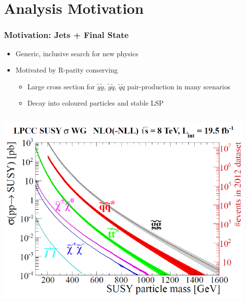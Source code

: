 \documentclass{beamer}
\begin{document}
\section{Analysis Motivation}
\begin{frame}
  \frametitle{Motivation: Jets + \met Final State}
  \begin{itemize}
  \item Generic, inclusive search for new physics
  \item Motivated by R-parity conserving \susy
    \begin{itemize}
    \item Large cross section for $\tilde{g}\tilde{g}$, $\tilde{g}\tilde{q}$, $\tilde{q}\tilde{q}$ pair-production in many scenarios
    \item Decay into coloured \sm particles and stable LSP
    \end{itemize}
  \end{itemize}
  \begin{columns}
    \begin{column}{0.5\textwidth}
      \centering
      \includegraphics[width=\textwidth]{susy/SUSY-XS-LHC2012-LPCC.png}
    \end{column}
    \begin{column}{0.5\textwidth}
\end{column}
\end{columns}
\end{frame}
\end{document}
